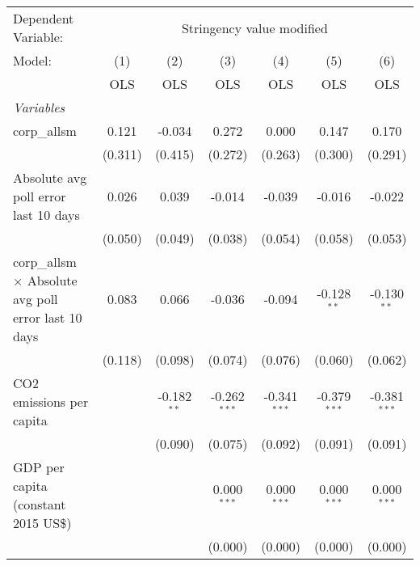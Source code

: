 
\begingroup
\centering
\begin{tabular}{lcccccc}
   \toprule
   Dependent Variable: & \multicolumn{6}{c}{Stringency value modified}\\
   Model:                                                      & (1)     & (2)           & (3)            & (4)            & (5)            & (6)\\  
                                                               &  OLS    & OLS           & OLS            & OLS            & OLS            & OLS\\  
   \midrule
   \emph{Variables}\\
   corp\_allsm                                                 & 0.121   & -0.034        & 0.272          & 0.000          & 0.147          & 0.170\\   
                                                               & (0.311) & (0.415)       & (0.272)        & (0.263)        & (0.300)        & (0.291)\\   
   Absolute avg poll error last 10 days                        & 0.026   & 0.039         & -0.014         & -0.039         & -0.016         & -0.022\\   
                                                               & (0.050) & (0.049)       & (0.038)        & (0.054)        & (0.058)        & (0.053)\\   
   corp\_allsm $\times$ Absolute avg poll error last 10 days   & 0.083   & 0.066         & -0.036         & -0.094         & -0.128$^{**}$  & -0.130$^{**}$\\   
                                                               & (0.118) & (0.098)       & (0.074)        & (0.076)        & (0.060)        & (0.062)\\   
   CO2 emissions per capita                                    &         & -0.182$^{**}$ & -0.262$^{***}$ & -0.341$^{***}$ & -0.379$^{***}$ & -0.381$^{***}$\\   
                                                               &         & (0.090)       & (0.075)        & (0.092)        & (0.091)        & (0.091)\\   
   GDP per capita (constant 2015 US\$)                         &         &               & 0.000$^{***}$  & 0.000$^{***}$  & 0.000$^{***}$  & 0.000$^{***}$\\   
                                                               &         &               & (0.000)        & (0.000)        & (0.000)        & (0.000)\\   

\end{tabular}
